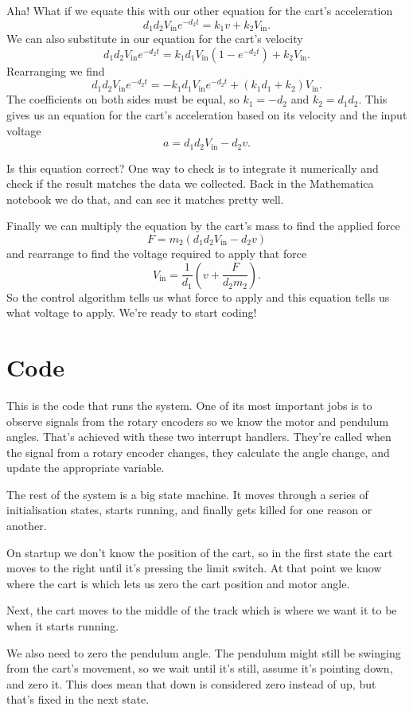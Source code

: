 \documentclass{article}
\begin{document}
Aha! What if we equate this with our other equation for the cart's acceleration \[d_1 d_2 V_\text{in} e^{-d_2 t} = k_1 v + k_2 V_\text{in}.\] We can also substitute in our equation for the cart's velocity \[d_1 d_2 V_\text{in} e^{-d_2 t} = k_1 d_1 V_\text{in} (1 - e^{-d_2 t}) + k_2 V_\text{in}.\] Rearranging we find \[d_1 d_2 V_\text{in} e^{-d_2 t} = -k_1 d_1 V_\text{in} e^{-d_2 t} + (k_1 d_1 + k_2) V_\text{in}.\] The coefficients on both sides must be equal, so $k_1 = -d_2$ and $k_2 = d_1 d_2$. This gives us an equation for the cart's acceleration based on its velocity and the input voltage \[a = d_1 d_2 V_\text{in} - d_2 v.\]

Is this equation correct? One way to check is to integrate it numerically and check if the result matches the data we collected. Back in the Mathematica notebook we do that, and can see it matches pretty well.

Finally we can multiply the equation by the cart's mass to find the applied force \[F = m_2 (d_1 d_2 V_\text{in} - d_2 v)\] and rearrange to find the voltage required to apply that force \[V_\text{in} = \frac{1}{d_1} \left( v + \frac{F}{d_2 m_2} \right).\] So the control algorithm tells us what force to apply and this equation tells us what voltage to apply. We're ready to start coding!

\section{Code}

This is the code that runs the system. One of its most important jobs is to observe signals from the rotary encoders so we know the motor and pendulum angles. That's achieved with these two interrupt handlers. They're called when the signal from a rotary encoder changes, they calculate the angle change, and update the appropriate variable.

The rest of the system is a big state machine. It moves through a series of initialisation states, starts running, and finally gets killed for one reason or another.

On startup we don't know the position of the cart, so in the first state the cart moves to the right until it's pressing the limit switch. At that point we know where the cart is which lets us zero the cart position and motor angle.

Next, the cart moves to the middle of the track which is where we want it to be when it starts running.

We also need to zero the pendulum angle. The pendulum might still be swinging from the cart's movement, so we wait until it's still, assume it's pointing down, and zero it. This does mean that down is considered zero instead of up, but that's fixed in the next state.
\end{document}
